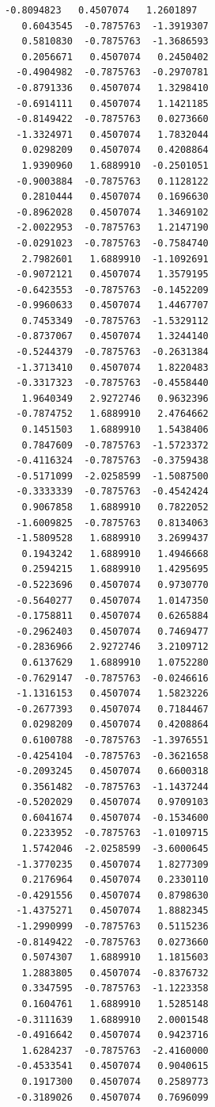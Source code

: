 \documentclass[11pt]{article}
\begin{document}
\begin{Verbatim}[commandchars=\\\{\}]
  -0.8094823   0.4507074   1.2601897
   0.6043545  -0.7875763  -1.3919307
   0.5810830  -0.7875763  -1.3686593
   0.2056671   0.4507074   0.2450402
  -0.4904982  -0.7875763  -0.2970781
  -0.8791336   0.4507074   1.3298410
  -0.6914111   0.4507074   1.1421185
  -0.8149422  -0.7875763   0.0273660
  -1.3324971   0.4507074   1.7832044
   0.0298209   0.4507074   0.4208864
   1.9390960   1.6889910  -0.2501051
  -0.9003884  -0.7875763   0.1128122
   0.2810444   0.4507074   0.1696630
  -0.8962028   0.4507074   1.3469102
  -2.0022953  -0.7875763   1.2147190
  -0.0291023  -0.7875763  -0.7584740
   2.7982601   1.6889910  -1.1092691
  -0.9072121   0.4507074   1.3579195
  -0.6423553  -0.7875763  -0.1452209
  -0.9960633   0.4507074   1.4467707
   0.7453349  -0.7875763  -1.5329112
  -0.8737067   0.4507074   1.3244140
  -0.5244379  -0.7875763  -0.2631384
  -1.3713410   0.4507074   1.8220483
  -0.3317323  -0.7875763  -0.4558440
   1.9640349   2.9272746   0.9632396
  -0.7874752   1.6889910   2.4764662
   0.1451503   1.6889910   1.5438406
   0.7847609  -0.7875763  -1.5723372
  -0.4116324  -0.7875763  -0.3759438
  -0.5171099  -2.0258599  -1.5087500
  -0.3333339  -0.7875763  -0.4542424
   0.9067858   1.6889910   0.7822052
  -1.6009825  -0.7875763   0.8134063
  -1.5809528   1.6889910   3.2699437
   0.1943242   1.6889910   1.4946668
   0.2594215   1.6889910   1.4295695
  -0.5223696   0.4507074   0.9730770
  -0.5640277   0.4507074   1.0147350
  -0.1758811   0.4507074   0.6265884
  -0.2962403   0.4507074   0.7469477
  -0.2836966   2.9272746   3.2109712
   0.6137629   1.6889910   1.0752280
  -0.7629147  -0.7875763  -0.0246616
  -1.1316153   0.4507074   1.5823226
  -0.2677393   0.4507074   0.7184467
   0.0298209   0.4507074   0.4208864
   0.6100788  -0.7875763  -1.3976551
  -0.4254104  -0.7875763  -0.3621658
  -0.2093245   0.4507074   0.6600318
   0.3561482  -0.7875763  -1.1437244
  -0.5202029   0.4507074   0.9709103
   0.6041674   0.4507074  -0.1534600
   0.2233952  -0.7875763  -1.0109715
   1.5742046  -2.0258599  -3.6000645
  -1.3770235   0.4507074   1.8277309
   0.2176964   0.4507074   0.2330110
  -0.4291556   0.4507074   0.8798630
  -1.4375271   0.4507074   1.8882345
  -1.2990999  -0.7875763   0.5115236
  -0.8149422  -0.7875763   0.0273660
   0.5074307   1.6889910   1.1815603
   1.2883805   0.4507074  -0.8376732
   0.3347595  -0.7875763  -1.1223358
   0.1604761   1.6889910   1.5285148
  -0.3111639   1.6889910   2.0001548
  -0.4916642   0.4507074   0.9423716
   1.6284237  -0.7875763  -2.4160000
  -0.4533541   0.4507074   0.9040615
   0.1917300   0.4507074   0.2589773
  -0.3189026   0.4507074   0.7696099

\end{Verbatim}
\end{document}
